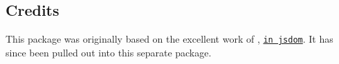 \subsection*{Credits}

This package was originally based on the excellent work of \href{https://github.com/nicolashenry}{\tt }, \href{https://github.com/tmpvar/jsdom/blob/16fd85618f2705d181232f6552125872a37164bc/lib/jsdom/living/helpers/encoding.js}{\tt in jsdom}. It has since been pulled out into this separate package. 
